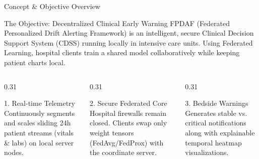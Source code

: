 \documentclass[aspectratio=169, 11pt]{beamer}
\begin{document}
\begin{frame}{Concept \& Objective Overview}
    \begin{block}{The Objective: Decentralized Clinical Early Warning}
        \scriptsize
        FPDAF (Federated Personalized Drift Alerting Framework) is an intelligent, secure Clinical Decision Support System (CDSS) running locally in intensive care units. Using Federated Learning, hospital clients train a shared model collaboratively while keeping patient charts local.
    \end{block}
    
    \begin{columns}[t]
        \begin{column}{0.31\textwidth}
            \begin{block}{\textcolor{neonCyan}{1.} Real-time Telemetry}
                \scriptsize
                Continuously segments and scales sliding 24h patient streams (vitals \& labs) on local server nodes.
            \end{block}
        \end{column}
        
        \begin{column}{0.31\textwidth}
            \begin{block}{\textcolor{neonTeal}{2.} Secure Federated Core}
                \scriptsize
                Hospital firewalls remain closed. Clients swap only weight tensors (FedAvg/FedProx) with the coordinate server.
            \end{block}
        \end{column}
        
        \begin{column}{0.31\textwidth}
            \begin{block}{\textcolor{neonAmber}{3.} Bedside Warnings}
                \scriptsize
                Generates stable vs. critical notifications along with explainable temporal heatmap visualizations.
            \end{block}
        \end{column}
    \end{columns}
\end{frame}
\end{document}
